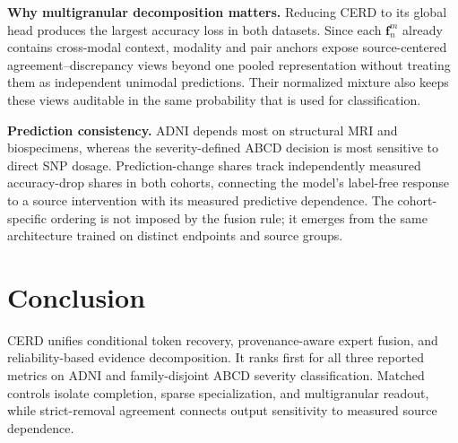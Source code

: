 \documentclass[a4paper,fleqn]{cas-dc}
\begin{document}
\noindent\textbf{Why multigranular decomposition matters.}
Reducing CERD to its global head produces the largest accuracy loss in both datasets. Since each \(\mathbf f_n^m\) already contains cross-modal context, modality and pair anchors expose source-centered agreement--discrepancy views beyond one pooled representation without treating them as independent unimodal predictions. Their normalized mixture also keeps these views auditable in the same probability that is used for classification.

\noindent\textbf{Prediction consistency.}
ADNI depends most on structural MRI and biospecimens, whereas the severity-defined ABCD decision is most sensitive to direct SNP dosage. Prediction-change shares track independently measured accuracy-drop shares in both cohorts, connecting the model's label-free response to a source intervention with its measured predictive dependence. The cohort-specific ordering is not imposed by the fusion rule; it emerges from the same architecture trained on distinct endpoints and source groups.

\section{Conclusion}

CERD unifies conditional token recovery, provenance-aware expert fusion, and reliability-based evidence decomposition. It ranks first for all three reported metrics on ADNI and family-disjoint ABCD severity classification. Matched controls isolate completion, sparse specialization, and multigranular readout, while strict-removal agreement connects output sensitivity to measured source dependence.

\clearpage
\renewcommand{\bibfont}{\fontsize{8.8pt}{10.92pt}\selectfont}
\setlength{\bibsep}{0.15pt}


\end{document}
